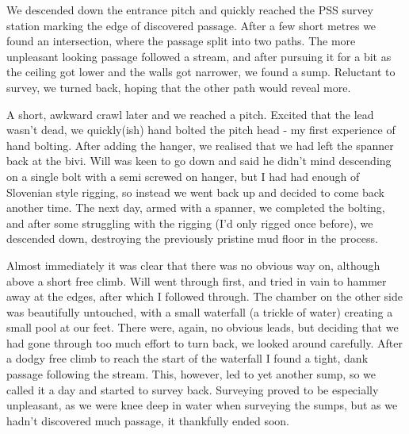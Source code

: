 We descended down the  entrance pitch and quickly reached the PSS survey station marking the edge of discovered passage. After a few short metres we found an intersection, where the passage split into two paths. The more unpleasant looking passage followed a stream, and after pursuing it for a bit as the ceiling got lower and the walls got narrower, we found a sump. Reluctant to survey, we turned back, hoping that the other path would reveal more. 

A short, awkward crawl later and we reached a pitch. Excited that the lead wasn't dead, we quickly(ish) hand bolted the pitch head - my first experience of hand bolting. After adding the hanger, we realised that we had left the spanner back at the bivi. Will was keen to go down and said he didn't mind descending on a single bolt with a semi screwed on hanger, but I had had enough of Slovenian style rigging, so instead we went back up and decided to come back another time.
The next day, armed with a spanner, we completed the bolting, and after some struggling with the rigging (I'd only rigged once before), we descended down, destroying the previously pristine mud floor in the process. 

Almost immediately it was clear that there was no obvious way on, although  above a short free climb. Will went through first, and tried in vain to hammer away at the edges, after which I followed through. The chamber on the other side was beautifully untouched, with a small waterfall (a trickle of water) creating a small pool at our feet. There were, again, no obvious leads, but deciding that we had gone through too much effort to turn back, we looked around carefully. After a dodgy free climb to reach the start of the waterfall I found a tight, dank passage following the stream. This, however, led to yet another sump, so we called it a day and started to survey back. 
Surveying proved to be especially unpleasant, as we were knee deep in water when surveying the sumps, but as we hadn't discovered much passage, it thankfully ended soon.
